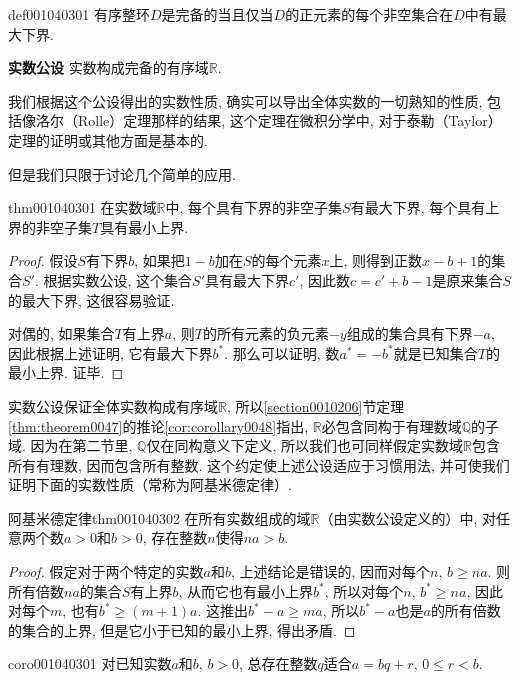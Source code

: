 \begin{definition}{}{def001040301}
有序整环$D$是完备的当且仅当$D$的正元素的每个非空集合在$D$中有最大下界. 
\end{definition}

\textbf{实数公设} \quad 实数构成完备的有序域$\mathbb{R}$. 

我们根据这个公设得出的实数性质, 确实可以导出全体实数的一切熟知的性质, 包括像洛尔（Rolle）定理那样的结果, 这个定理在微积分学中, 对于泰勒（Taylor）定理的证明或其他方面是基本的. 

但是我们只限于讨论几个简单的应用. 
\begin{theorem}{}{thm001040301}
在实数域$\mathbb{R}$中, 每个具有下界的非空子集$S$有最大下界, 每个具有上界的非空子集$T$具有最小上界. 
\end{theorem}

\begin{proof}
假设$S$有下界$b$, 如果把$1-b$加在$S$的每个元素$x$上, 则得到正数$x-b+1$的集合$S'$. 根据实数公设, 这个集合$S'$具有最大下界$c'$, 因此数$c=c'+b-1$是原来集合$S$的最大下界, 这很容易验证. 

对偶的, 如果集合$T$有上界$a$, 则$T$的所有元素的负元素$-y$组成的集合具有下界$-a$, 因此根据上述证明, 它有最大下界$b^*$. 那么可以证明, 数$a^*=-b^*$就是已知集合$T$的最小上界. 证毕. 
\end{proof}

实数公设保证全体实数构成有序域$\mathbb{R}$, 所以\ref{section0010206}节定理\ref{thm:theorem0047}的推论\ref{cor:corollary0048}指出, $\mathbb{R}$必包含同构于有理数域$\mathbb{Q}$的子域. 因为在第二节里, $\mathbb{Q}$仅在同构意义下定义, 所以我们也可同样假定实数域$\mathbb{R}$包含所有有理数, 因而包含所有整数. 这个约定使上述公设适应于习惯用法, 并可使我们证明下面的实数性质（常称为阿基米德定律）. 
\begin{theorem}{阿基米德定律}{thm001040302}
在所有实数组成的域$\mathbb{R}$（由实数公设定义的）中, 对任意两个数$a > 0$和$b>0$, 存在整数$n$使得$na > b$. 
\end{theorem}
\begin{proof}
假定对于两个特定的实数$a$和$b$, 上述结论是错误的, 因而对每个$n$, $b \ge na$. 则所有倍数$na$的集合$S$有上界$b$, 从而它也有最小上界$b^*$, 所以对每个$n$, $b^* \ge na$, 因此对每个$m$, 也有$b^* \ge (m+1)a$. 这推出$b^*-a \ge ma$, 所以$b^*-a$也是$a$的所有倍数的集合的上界, 但是它小于已知的最小上界, 得出矛盾. 
\end{proof}

\begin{corollary}{}{coro001040301}
对已知实数$a$和$b$, $b > 0$, 总存在整数$q$适合$a = bq + r$, $0 \le r < b$. 
\end{corollary}

